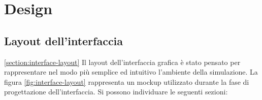 \chapter{Design}


%
\section{Layout dell'interfaccia} \ref{section:interface-layout}
Il layout dell'interfaccia grafica è stato pensato per rappresentare nel modo più semplice ed intuitivo l'ambiente della simulazione.  La figura \ref{fig:interface-layout} rappresenta un mockup utilizzato durante la fase di progettazione dell'interfaccia. Si possono individuare le seguenti sezioni:
